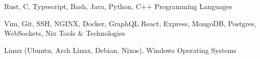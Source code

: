 

\begin{cventries}

  \cventry
    {Rust, C, Typescript, Bash, Java, Python, C++} %
    {Programming Languages} %
    {} %
    {} %
    {}


  \cventry
    {Vim, Git, SSH, NGINX, Docker, GraphQL React, Express, MongoDB, Postgres, WebSockets, Nix} %
    {Tools \& Technologies} %
    {} %
    {} %
    {}


  \cventry
    {Linux (Ubuntu, Arch Linux, Debian, Nixos), Windows} %
    {Operating Systems} %
    {} %
    {} %
    {}
\end{cventries}





